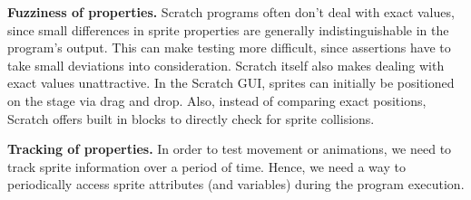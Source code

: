 \textbf{Fuzziness of properties.}
Scratch programs often don't deal with exact values,
since small differences in sprite properties are generally indistinguishable in the program's output.
This can make testing more difficult, since assertions have to take small deviations into consideration.
Scratch itself also makes dealing with exact values unattractive.
In the Scratch GUI, sprites can initially be positioned on the stage via drag and drop.
Also, instead of comparing exact positions, Scratch offers built in blocks to directly check for sprite collisions.
\parspace

\textbf{Tracking of properties.}
In order to test movement or animations, we need to track sprite information over a period of time.
Hence, we need a way to periodically access sprite attributes (and variables) during the program execution.
\parspace
